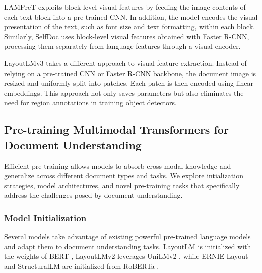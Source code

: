 \ac{LAMPreT} \citep{wu2021lampret} exploits block-level visual features by feeding the image contents of each text block into a pre-trained \ac{CNN}. In addition, the model encodes the visual presentation of the text, such as font size and text formatting, within each block. Similarly, SelfDoc \citep{li2021selfdoc} uses block-level visual features obtained with Faster R-CNN, processing them separately from language features through a visual encoder.  

LayoutLMv3 \citep{huang2022layoutlmv3} takes a different approach to visual feature extraction. Instead of relying on a pre-trained \ac{CNN} or Faster R-CNN backbone, the document image is resized and uniformly split into patches. Each patch is then encoded using linear embeddings. This approach not only saves parameters but also eliminates the need for region annotations in training object detectors.



\subsection{Pre-training Multimodal Transformers for Document Understanding}

Efficient pre-training allows models to absorb cross-modal knowledge and generalize across different document types and tasks. We explore intialization strategies, model architectures, and novel pre-training tasks that specifically address the challenges posed by document understanding.

\subsubsection{Model Initialization} 

Several models take advantage of existing powerful pre-trained language models and adapt them to document understanding tasks. LayoutLM \citep{xu2020layoutlm} is initialized with the weights of \ac{BERT} \citep{devlin2018bert}, LayoutLMv2 \citep{xu2020layoutlmv2} leverages UniLMv2 \citep{bao2020unilmv2}, while ERNIE-Layout \citep{peng2022ernie} and StructuralLM \citep{li2021structurallm} are initialized from RoBERTa \citep{liu2019roberta}.

